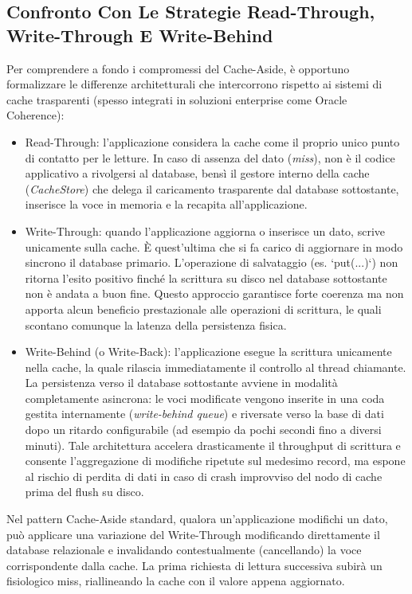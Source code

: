 \documentclass[11pt, a4paper]{article}
\begin{document}
\subsection{Confronto Con Le Strategie Read-Through, Write-Through E Write-Behind}

Per comprendere a fondo i compromessi del Cache-Aside, è opportuno formalizzare le differenze architetturali che intercorrono rispetto ai sistemi di cache trasparenti (spesso integrati in soluzioni enterprise come Oracle Coherence):

\begin{itemize}
    \item Read-Through: l'applicazione considera la cache come il proprio unico punto di contatto per le letture. In caso di assenza del dato (\emph{miss}), non è il codice applicativo a rivolgersi al database, bensì il gestore interno della cache (\emph{CacheStore}) che delega il caricamento trasparente dal database sottostante, inserisce la voce in memoria e la recapita all'applicazione.
    \item Write-Through: quando l'applicazione aggiorna o inserisce un dato, scrive unicamente sulla cache. È quest'ultima che si fa carico di aggiornare in modo sincrono il database primario. L'operazione di salvataggio (es. `put(...)`) non ritorna l'esito positivo finché la scrittura su disco nel database sottostante non è andata a buon fine. Questo approccio garantisce forte coerenza ma non apporta alcun beneficio prestazionale alle operazioni di scrittura, le quali scontano comunque la latenza della persistenza fisica.
    \item Write-Behind (o Write-Back): l'applicazione esegue la scrittura unicamente nella cache, la quale rilascia immediatamente il controllo al thread chiamante. La persistenza verso il database sottostante avviene in modalità completamente asincrona: le voci modificate vengono inserite in una coda gestita internamente (\emph{write-behind queue}) e riversate verso la base di dati dopo un ritardo configurabile (ad esempio da pochi secondi fino a diversi minuti). Tale architettura accelera drasticamente il throughput di scrittura e consente l'aggregazione di modifiche ripetute sul medesimo record, ma espone al rischio di perdita di dati in caso di crash improvviso del nodo di cache prima del flush su disco.
\end{itemize}

Nel pattern Cache-Aside standard, qualora un'applicazione modifichi un dato, può applicare una variazione del Write-Through modificando direttamente il database relazionale e invalidando contestualmente (cancellando) la voce corrispondente dalla cache. La prima richiesta di lettura successiva subirà un fisiologico miss, riallineando la cache con il valore appena aggiornato.
\end{document}
